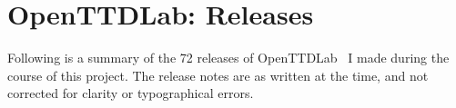 \documentclass[logo,msc,dsti]{style/infthesis}    %
\begin{document}
{%












\printbibliography[heading=bibliography,title={Bibliography}]


\appendix

\chapter{OpenTTDLab: Releases}
\label{chapter:openttdlab-releases}

Following is a summary of the 72 releases of OpenTTDLab~\cite{openttd} I made during the course of this project. The release notes are as written at the time, and not corrected for clarity or typographical errors.

}
\end{document}
